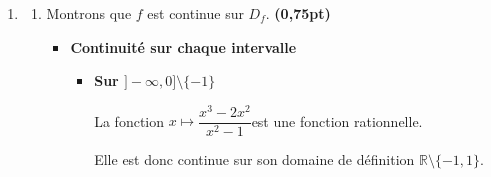 \documentclass[12pt,a4paper]{article}
\begin{document}
\begin{enumerate}
\begin{enumerate}
\begin{itemize}
Donc  $\lim\limits_{x \to +\infty} \dfrac{f(x)}{x} = 2 $       

\item Cherchons  $\lim\limits_{x \to +\infty} f(x)-2x $ 

\(
\begin{aligned}
 \lim\limits_{x \to +\infty} f(x)-2x &= \lim\limits_{x \to +\infty} x + \sqrt{x^2+x}-2x\\
 																		 &= \lim\limits_{x \to +\infty} \sqrt{x^2+x}-x\\
 																		 &= \lim\limits_{x \to +\infty} \dfrac{x^2+x-x^2}{\sqrt{x^2+x}+x} \\
 																		 &= \lim\limits_{x \to +\infty} \dfrac{x}{\sqrt{x^2+x}+x} \\
 																		 &= \lim\limits_{x \to +\infty} \dfrac{x}{x\left(1 + \sqrt{1+\dfrac{1}{x}}\right)} \\
 																		 &= \lim\limits_{x \to +\infty} \dfrac{1}{\left(1 + \sqrt{1+\dfrac{1}{x}}\right)} \\
 																	   &= \dfrac{1}{2}
\end{aligned}    
\)   
 
\end{itemize}
  		    
    \begin{resultbox}
    \[
    \mathbf{ \text{Donc } (\Delta_2):  y = 2x+\dfrac{1}{2}  \text{ est une asymptote oblique à } (\mathcal{C}_f) \text{en } +\infty }
    \]
   \end{resultbox}         
        
    \end{enumerate}
    \item 
    \begin{enumerate}
        \item Montrons que $f$ est continue sur $D_f$. \textbf{(0,75pt)}

\begin{itemize}
\item \textbf{Continuité sur chaque intervalle}

\begin{itemize}
\item \textbf{ Sur $]-\infty,0]\setminus\{-1\}$}

La fonction
\(
x\longmapsto \dfrac{x^3-2x^2}{x^2-1}
\)est une fonction rationnelle. 

Elle est donc continue sur son domaine de définition
\(
\mathbb{R}\setminus\{-1,1\}.
\)


\end{itemize}
\end{itemize}
\end{enumerate}
\end{enumerate}
\end{document}
